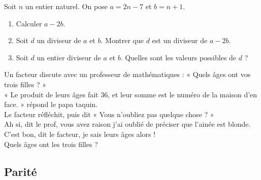 {\begin{Exercice}
Soit $ n $ un entier naturel.
On pose $ a = 2n - 7 $ et $ b=n + 1 $.
\begin{enumerate}
\item Calculer $ a - 2b $.
\item Soit $ d $ un diviseur de $ a $ et $ b $. Montrer que $ d $ est un diviseur de $ a - 2b $.
\item Soit $ d $ un entier diviseur de $ a $ et $ b $.
Quelles sont les valeurs possibles de $ d $ ?
\end{enumerate}
\end{Exercice}

\begin{Exercice}
Un facteur discute avec un professeur de mathématiques :
« Quels âges ont vos trois filles ? »\\
« Le produit de leurs âges fait 36, et leur somme est le numéro de la maison d'en face. » répond le papa taquin.\\
Le facteur réfléchit, puis dit « Vous n'oubliez pas quelque chose ? »\\
Ah si, dit le prof, vous avez raison j'ai oublié de préciser que l'ainée est blonde.\\
C'est bon, dit le facteur, je sais leurs âges alors !\\
Quels âges ont les trois filles ?
\end{Exercice}

\newpage

\subsection*{Parité}


}
